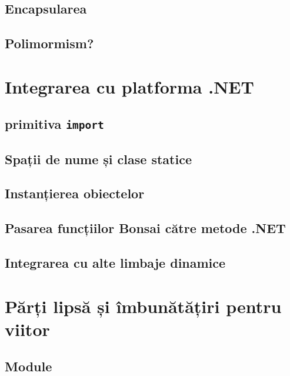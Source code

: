 \documentclass[12pt,a4paper]{memoir}
\begin{document}
\section{Encapsularea}


\section{Polimormism?}


\chapter{Integrarea cu platforma .NET}

\section{primitiva \texttt{import}}

\section{Spații de nume și clase statice}

\section{Instanțierea obiectelor}

\section{Pasarea funcțiilor Bonsai către metode .NET}

\section{Integrarea cu alte limbaje dinamice}

\chapter{Părți lipsă și îmbunătățiri pentru viitor}

\section{Module}
\end{document}
